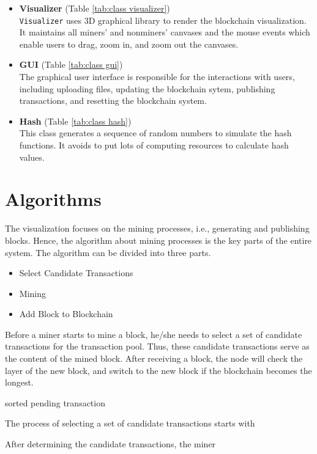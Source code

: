 \begin{itemize}
    \item \textbf{Visualizer} (Table \ref{tab:class visualizer}) \\
        \texttt{Visualizer} uses 3D graphical library to render the blockchain visualization. It maintains all miners' and nonminers' canvases and the mouse events which enable users to drag, zoom in, and zoom out the canvases.
    \item \textbf{GUI} (Table \ref{tab:class gui}) \\
        The graphical user interface is responsible for the interactions with users, including uploading files, updating the blockchain sytem, publishing transactions, and resetting the blockchain system.
    \item \textbf{Hash} (Table \ref{tab:class hash}) \\
        This class generates a sequence of random numbers to simulate the hash functions. It avoids to put lots of computing resources to calculate hash values.
\end{itemize}

\section{Algorithms}
\label{algorithms}

The visualization focuses on the mining processes, i.e., generating and publishing blocks. Hence, the algorithm about mining processes is the key parts of the entire system. The algorithm can be divided into three parts.

\begin{itemize}
    \item Select Candidate Transactions
    \item Mining
    \item Add Block to Blockchain
\end{itemize}

Before a miner starts to mine a block, he/she needs to select a set of candidate transactions for the transaction pool. Thus, these candidate transactions serve as the content of the mined block. After receiving a block, the node will check the layer of the new block, and switch to the new block if the blockchain becomes the longest.

sorted pending transaction

The process of selecting a set of candidate transactions starts with

After determining the candidate transactions, the miner

